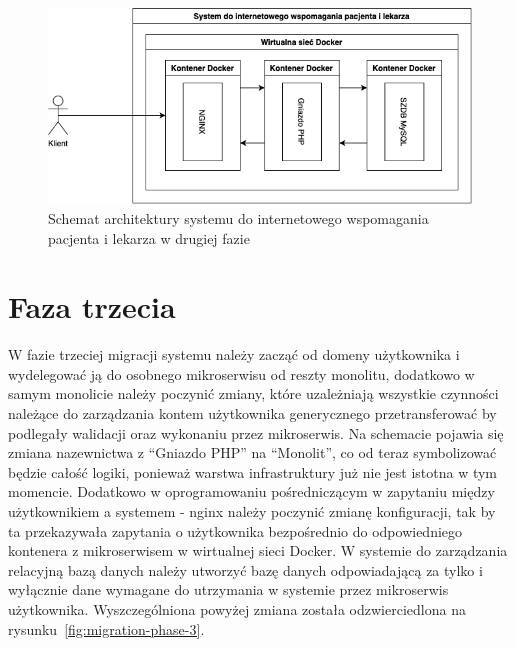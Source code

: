 \documentclass[12pt,oneside]{book}
\newcommand{\captionvspace}{\vspace{6pt}}
\begin{document}
    \begin{figure}[ht]
        \centering
        \includegraphics[width=\textwidth]{includes/images/migration-phase-2.png}
        \captionvspace
        \caption{Schemat architektury systemu do internetowego wspomagania pacjenta i lekarza w drugiej fazie}
        \label{fig:migration-phase-2}
    \end{figure}


    \section{Faza trzecia}
    W fazie trzeciej migracji systemu należy zacząć od domeny użytkownika i wydelegować ją do osobnego mikroserwisu od reszty monolitu, dodatkowo w samym monolicie należy poczynić zmiany, które uzależniają wszystkie czynności należące do zarządzania kontem użytkownika generycznego przetransferować by podlegały walidacji oraz wykonaniu przez mikroserwis. Na schemacie pojawia się zmiana nazewnictwa z “Gniazdo PHP” na “Monolit”, co od teraz symbolizować będzie całość logiki, ponieważ warstwa infrastruktury już nie jest istotna w tym momencie. Dodatkowo w oprogramowaniu pośredniczącym w zapytaniu między użytkownikiem a systemem - nginx należy poczynić zmianę konfiguracji, tak by ta przekazywała zapytania o użytkownika bezpośrednio do odpowiedniego kontenera z mikroserwisem w wirtualnej sieci Docker. W systemie do zarządzania relacyjną bazą danych należy utworzyć bazę danych odpowiadającą za tylko i wyłącznie dane wymagane do utrzymania w systemie przez mikroserwis użytkownika. Wyszczególniona powyżej zmiana została odzwierciedlona na rysunku~\ref{fig:migration-phase-3}.
\end{document}
